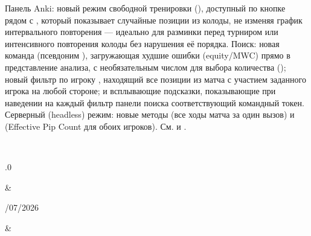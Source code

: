 \documentclass[letterpaper,10pt,russian]{sphinxmanual}
\begin{document}
\begin{savenotes}
\begin{longtable}{}
\begin{varwidth}[t]{}
Панель Anki: новый режим свободной тренировки (), доступный по кнопке  рядом с , который показывает случайные позиции из колоды, не изменяя график интервального повторения — идеально для разминки перед турниром или интенсивного повторения колоды без нарушения её порядка. Поиск: новая команда  (псевдоним ), загружающая худшие ошибки (equity/MWC) прямо в представление анализа, с необязательным числом для выбора количества (); новый фильтр по игроку , находящий все позиции из матча с участием заданного игрока на любой стороне; и всплывающие подсказки, показывающие при наведении на каждый фильтр панели поиска соответствующий командный токен. Серверный (headless) режим: новые методы  (все ходы матча за один вызов) и  (Effective Pip Count для обоих игроков). См. {\hyperref[\detokenize{manuel:panneau-anki}]{}} и {\hyperref[\detokenize{cmd_mode:cmd-mode}]{}}.
\sphinxbeforeendvarwidth
\end{varwidth}%
\\
\sphinxhline\begin{varwidth}[t]{}
.0
\sphinxbeforeendvarwidth
\end{varwidth}%
&\begin{varwidth}[t]{}
/07/2026
\sphinxbeforeendvarwidth
\end{varwidth}%
&\begin{varwidth}[t]{}
\sphinxAtStartPar

\end{varwidth}
\end{longtable}
\end{savenotes}
\end{document}
